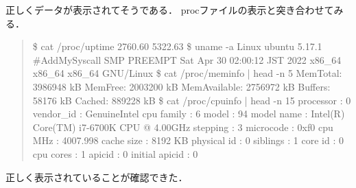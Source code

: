 正しくデータが表示されてそうである．
procファイルの表示と突き合わせてみる．
\begin{quote}
\$ cat /proc/uptime 
2760.60 5322.63
\$ uname -a
Linux ubuntu 5.17.1 #AddMySyscall SMP PREEMPT Sat Apr 30 02:00:12 JST 2022 x86_64 x86_64 x86_64 GNU/Linux
\$ cat /proc/meminfo | head -n 5
MemTotal:        3986948 kB
MemFree:         2003200 kB
MemAvailable:    2756972 kB
Buffers:           58176 kB
Cached:           889228 kB
\$ cat /proc/cpuinfo | head -n 15
processor	: 0
vendor_id	: GenuineIntel
cpu family	: 6
model		: 94
model name	: Intel(R) Core(TM) i7-6700K CPU @ 4.00GHz
stepping	: 3
microcode	: 0xf0
cpu MHz		: 4007.998
cache size	: 8192 KB
physical id	: 0
siblings	: 1
core id		: 0
cpu cores	: 1
apicid		: 0
initial apicid	: 0
\end{quote}

正しく表示されていることが確認できた．


